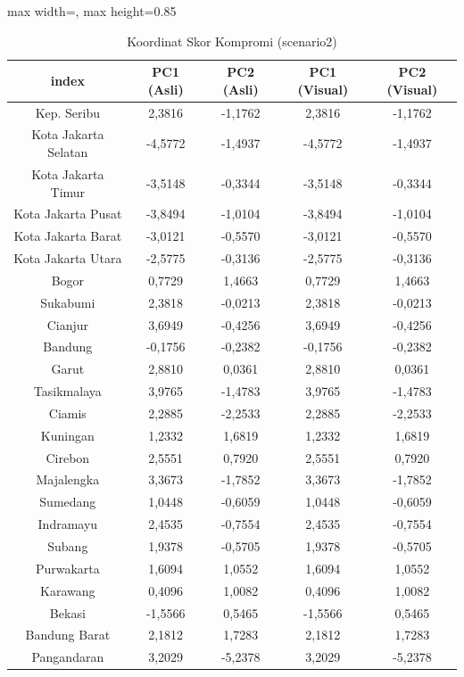 \begin{table}[H]
\centering
\caption{Koordinat Skor Kompromi (scenario2)} \label{tab:app2scores}
\begin{adjustbox}{max width=\textwidth, max height=0.85\textheight}
\begin{tabular}{|c|c|c|c|c|}
\hline
\textbf{index} & \textbf{PC1 (Asli)} & \textbf{PC2 (Asli)} & \textbf{PC1 (Visual)} & \textbf{PC2 (Visual)} \\
\hline
Kep. Seribu & 2,3816 & -1,1762 & 2,3816 & -1,1762 \\
Kota Jakarta Selatan & -4,5772 & -1,4937 & -4,5772 & -1,4937 \\
Kota Jakarta Timur & -3,5148 & -0,3344 & -3,5148 & -0,3344 \\
Kota Jakarta Pusat & -3,8494 & -1,0104 & -3,8494 & -1,0104 \\
Kota Jakarta Barat & -3,0121 & -0,5570 & -3,0121 & -0,5570 \\
Kota Jakarta Utara & -2,5775 & -0,3136 & -2,5775 & -0,3136 \\
Bogor & 0,7729 & 1,4663 & 0,7729 & 1,4663 \\
Sukabumi & 2,3818 & -0,0213 & 2,3818 & -0,0213 \\
Cianjur & 3,6949 & -0,4256 & 3,6949 & -0,4256 \\
Bandung & -0,1756 & -0,2382 & -0,1756 & -0,2382 \\
Garut & 2,8810 & 0,0361 & 2,8810 & 0,0361 \\
Tasikmalaya & 3,9765 & -1,4783 & 3,9765 & -1,4783 \\
Ciamis & 2,2885 & -2,2533 & 2,2885 & -2,2533 \\
Kuningan & 1,2332 & 1,6819 & 1,2332 & 1,6819 \\
Cirebon & 2,5551 & 0,7920 & 2,5551 & 0,7920 \\
Majalengka & 3,3673 & -1,7852 & 3,3673 & -1,7852 \\
Sumedang & 1,0448 & -0,6059 & 1,0448 & -0,6059 \\
Indramayu & 2,4535 & -0,7554 & 2,4535 & -0,7554 \\
Subang & 1,9378 & -0,5705 & 1,9378 & -0,5705 \\
Purwakarta & 1,6094 & 1,0552 & 1,6094 & 1,0552 \\
Karawang & 0,4096 & 1,0082 & 0,4096 & 1,0082 \\
Bekasi & -1,5566 & 0,5465 & -1,5566 & 0,5465 \\
Bandung Barat & 2,1812 & 1,7283 & 2,1812 & 1,7283 \\
Pangandaran & 3,2029 & -5,2378 & 3,2029 & -5,2378 \\

\end{tabular}
\end{adjustbox}
\end{table}
